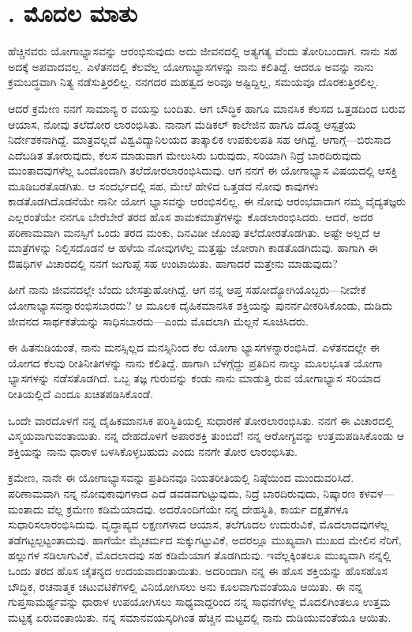 
\chapter{. ಮೊದಲ ಮಾತು}

ಹೆಚ್ಚಿನವರು ಯೋಗಾಭ್ಯಾಸವನ್ನು ಆರಂಭಿಸುವುದು ಅದು ಜೀವನದಲ್ಲಿ ಅತ್ಯಗತ್ಯ ವೆಂದು ತೋರಿಬಂದಾಗ. ನಾನು ಸಹ ಅದಕ್ಕೆ ಅಪವಾದವಲ್ಲ. ಎಳೆತನದಲ್ಲಿ ಕೆಲವೆಲ್ಲ ಯೋಗಾಭ್ಯಾಸಗಳನ್ನು ನಾನು ಕಲಿತಿದ್ದೆ. ಆದರೂ ಅವನ್ನು ನಾನು ಕ್ರಮಬದ್ಧವಾಗಿ ನಿತ್ಯ ನಡೆಸುತ್ತಿರಲಿಲ್ಲ. ನನಗದರ ಮಹತ್ವದ ಅರಿವೂ ಅಷ್ಟಿದ್ದಿಲ್ಲ, ಸಮಯವೂ ದೊರಕುತ್ತಿರಲಿಲ್ಲ.

ಆದರೆ ಕ್ರಮೇಣ ನನಗೆ ಸಾಮಾನ್ಯ  ರ ವಯಸ್ಸು ಬಂದಿತು. ಆಗ ಬೌದ್ಧಿಕ ಹಾಗೂ ಮಾನಸಿಕ ಕೆಲಸದ ಒತ್ತಡದಿಂದ ಬರುವ ಆಯಾಸ, ನೋವು ತಲೆದೋರ ಲಾರಂಭಿಸಿತು. ನಾನಾಗ ಮೆಡಿಕಲ್ ಕಾಲೇಜಿನ ಹಾಗೂ ದೊಡ್ಡ ಆಸ್ಪತ್ರೆಯ ನಿರ್ದೇಶಕನಾಗಿದ್ದೆ. ಮಾತ್ರವಲ್ಲದೆ ವಿಶ್ವವಿದ್ಯಾನಿಲಯದ ತಾತ್ಕಾಲಿಕ ಉಪಕುಲಪತಿ ಸಹ ಆಗಿದ್ದೆ. ಆಗಾಗ್ಗೆ—ಬಿರುಸಾದ ಎದೆಬಡಿತ ತೋರುವುದು, ಕೆಲಸ ಮಾಡುವಾಗ ಮೇಲುಸಿರು ಬರುವುದು, ಸರಿಯಾಗಿ ನಿದ್ರೆ ಬಾರದಿರುವುದು ಮುಂತಾದವುಗಳೆಲ್ಲ ಒಂದೊಂದಾಗಿ ತಲೆದೋರಲಾರಂಭಿಸಿದುವು. ಆಗ ನನಗೆ ಈ ಯೋಗಾಭ್ಯಾಸ ವಿಷಯದಲ್ಲಿ ಆಸಕ್ತಿ ಮೂಡಿಬರತೊಡಗಿತು. ಆ ಸಂದರ್ಭದಲ್ಲಿ ಸಹ, ಮೇಲೆ ಹೇಳಿದ ಒತ್ತಡದ ನೋವು ಕಾವುಗಳು ಕಾಡತೊಡಗಿದೊಡನೆಯೇ ನಾನೀ ಯೋಗ ಭ್ಯಾಸವನ್ನು ಆರಂಭಿಸಲಿಲ್ಲ. ಈ ನೋವು ಆರಂಭವಾದಾಗ ನಮ್ಮ ವೈದ್ಯತಜ್ಞರು ಎಲ್ಲರಂತೆಯೇ ನನಗೂ ಬೇರೆಬೇರೆ ತರದ ಹೊಸ ಶಾಮಕಮಾತ್ರೆಗಳನ್ನು  ಕೊಡಲಾರಂಭಿಸಿದರು. ಆದರೆ, ಅದರ ಪರಿಣಾಮವಾಗಿ ಮನಸ್ಸಿಗೆ ಒಂದು ತರದ ಮಂಕು, ದಿನವಿಡೀ ಜೊಂಪು ತಲೆದೋರತೊಡಗಿತು. ಅಷ್ಟೇ ಅಲ್ಲದೆ ಆ ಮಾತ್ರೆಗಳನ್ನು ನಿಲ್ಲಿಸದೊಡನೆ ಆ ಹಳೆಯ ನೋವುಗಳೆಲ್ಲ ಮತ್ತಷ್ಟು ಜೋರಾಗಿ ಕಾಡತೊಡಗಿದುವು. ಹಾಗಾಗಿ ಈ ಔಷಧಿಗಳ ವಿಚಾರದಲ್ಲಿ ನನಗೆ ಜುಗುಪ್ಸೆ ಸಹ ಉಂಟಾಯಿತು. ಹಾಗಾದರೆ ಮತ್ತೇನು ಮಾಡುವುದು?

ಹೀಗೆ ನಾನು ಜೀವನದಲ್ಲೇ ಬೆಂದು ಬೇಸತ್ತುಹೋಗಿದ್ದೆ. ಆಗ ನನ್ನ ಆಪ್ತ ಸಹೋದ್ಯೋಗಿಯೊಬ್ಬರು—ನೀವೇಕೆ ಯೋಗಾಭ್ಯಾಸವನ್ನಾರಂಭಿಸಬಾರದು? ಆ ಮೂಲಕ ದೈಹಿಕಮಾನಸಿಕ ಶಕ್ತಿಯನ್ನು ಪುನರ್ನವೀಕರಿಸಿಕೊಂಡು, ದುಡಿದು ಜೀವನದ ಸಾರ್ಥಕತೆಯನ್ನು ಸಾಧಿಸಬಾರದು—ಎಂದು ಮೊದಲಾಗಿ ಮೆಲ್ಲನೆ ಸೂಚಿಸಿದರು.

ಈ ಹಿತನುಡಿಯಂತೆ, ನಾನು ಮನಸ್ಸಿಲ್ಲದ ಮನಸ್ಸಿನಿಂದ ಕೆಲ ಯೋಗಾ ಭ್ಯಾಸಗಳನ್ನಾರಂಭಿಸಿದೆ. ಎಳೆತನದಲ್ಲೇ ಈ ಯೋಗದ ಕೆಲವು ರೀತಿನೀತಿಗಳನ್ನು ನಾನು ಕಲಿತಿದ್ದೆ. ಹಾಗಾಗಿ ಬೆಳಗ್ಗೆದ್ದು ಪ್ರತಿದಿನ ನಾಲ್ಕು ಮೂಲಭೂತ ಯೋಗಾ ಭ್ಯಾಸಗಳನ್ನು ನಡೆಸತೊಡಗಿದೆ. ಒಬ್ಬ ತಜ್ಞ ಗುರುವನ್ನು ಕಂಡು ನಾನು ಮಾಡುತ್ತಿ ರುವ ಯೋಗಾಭ್ಯಾಸ ಸರಿಯಾದ ರೀತಿಯಲ್ಲಿದೆ ಎಂದೂ ಖಚಿತಪಡಿಸಿಕೊಂಡೆ.

ಒಂದೇ ವಾರದೊಳಗೆ ನನ್ನ ದೈಹಿಕಮಾನಸಿಕ ಪರಿಸ್ಥಿತಿಯಲ್ಲಿ ಸುಧಾರಣೆ ತೋರಲಾರಂಭಿಸಿತು. ನನಗೆ ಈ ವಿಚಾರದಲ್ಲಿ ವಿಸ್ಮಯವಾಗುವಂತಾಯಿತು. ನನ್ನ ದೇಹದೊಳಗೆ ಅಪಾರಶಕ್ತಿ ತುಂಬಿದೆ! ನನ್ನ ಆರೋಗ್ಯವನ್ನು ಉತ್ತಮಪಡಿಸಿಕೊಂಡು ಆ ಶಕ್ತಿಯನ್ನು ನಾನು ಧಾರಾಳ ಬಳಸಿಕೊಳ್ಳಬಹುದು ಎಂದು ನನಗೇ ತೋರ ಲಾರಂಭಿಸಿತು.

ಕ್ರಮೇಣ, ನಾನೇ ಈ ಯೋಗಾಭ್ಯಾಸವನ್ನು ಪ್ರತಿದಿನವೂ ನಿಯತರೀತಿಯಲ್ಲಿ ನಿಷ್ಠೆಯಿಂದ ಮುಂದುವರಿಸಿದೆ. ಪರಿಣಾಮವಾಗಿ ನನ್ನ ನೋವುಕಾವುಗಳಾದ ಎದೆ ಡವಡವಗುಟ್ಟುವುದು, ನಿದ್ರೆ ಬಾರದಿರುವುದು, ನಿಷ್ಕಾರಣ ಕಳವಳ—ಮಂತಾದು ವೆಲ್ಲ ಕ್ರಮೇಣ ಕಡಿಮೆಯಾದವು. ಅದರೊಂದಿಗೆಯೇ ನನ್ನ ದೇಹಸ್ಥಿತಿ, ಕಾರ್ಯ ದಕ್ಷತೆಗಳೂ ಸುಧಾರಿಸಲಾರಂಭಿಸಿದುವು. ವೃದ್ಧಾಪ್ಯದ ಲಕ್ಷಣಗಳಾದ ಆಯಾಸ, ತಲೆಗೂದಲ ಉದುರುವಿಕೆ, ಮೊದಲಾದವುಗಳೆಲ್ಲ ತಡೆಗಟ್ಟಲ್ಪಟ್ಟಂತಾದುವು. ಹಾಗೆಯೇ ಮೈಚರ್ಮದ ಸುಕ್ಕುಗಟ್ಟುವಿಕೆ, ಅದರಲ್ಲೂ ಮುಖ್ಯವಾಗಿ ಮುಖದ ಮೇಲಿನ ನೆರಿಗೆ, ಹಲ್ಲುಗಳ ಸಡಿಲಾಗುವಿಕೆ, ಮೊದಲಾದವು ಸಹ ಕಡಿಮೆಯಾಗ ತೊಡಗಿದುವು. ಇವೆಲ್ಲಕ್ಕಿಂತಲೂ ಮುಖ್ಯವಾಗಿ ನನ್ನಲ್ಲಿ ಒಂದು ತರದ ಹೊಸ ಚೈತನ್ಯದ ಉದಯವಾದಂತಾಯಿತು. ಅದರಿಂದಾಗಿ ನನ್ನ ಈ ಹೊಸ ಶಕ್ತಿಯನ್ನು ಹೊಸಹೊಸ ಬೌದ್ಧಿಕ, ರಚನಾತ್ಮಕ ಚಟುವಟಿಕೆಗಳಲ್ಲಿ ವಿನಿಯೋಗಿಸಲು ಅನು ಕೂಲವಾಗುವಂತೆಯೂ ಆಯಿತು. ಈ ನನ್ನ ಗುಪ್ತಸಾಮರ್ಥ್ಯವನ್ನು ಧಾರಾಳ ಉಪಯೋಗಿಸಲು ಸಾಧ್ಯವಾದ್ದರಿಂದ ನನ್ನ ಸಾಧನೆಗಳೆಲ್ಲ ಮೊದಲಿಗಿಂತಲೂ ಉತ್ತಮ ಮಟ್ಟಕ್ಕೆ ಏರುವಂತಾಯಿತು. ನನ್ನ ಸಮಾನವಯಸ್ಕರಿಗಿಂತ ಹೆಚ್ಚಿನ ಮಟ್ಟದಲ್ಲಿ ನಾನು ದುಡಿಯುವಂತೆಯೂ ಆಯಿತು.

